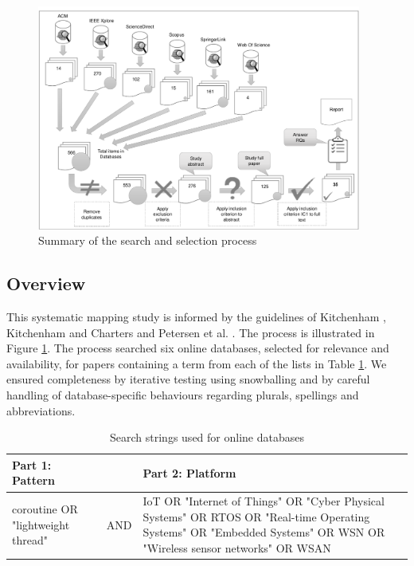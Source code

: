 \documentclass[format=acmsmall, review=false, screen=false]{acmart}
\begin{document}
\begin{figure}[h]
	\includegraphics[width=0.95\textwidth]{summary-of-search-and-selection-process}
	\caption{Summary of the search and selection process}
	\label{fig:sms}
\end{figure}

\subsection{Overview}

This systematic mapping study is informed by the guidelines of Kitchenham \cite{Kitchenham2004}, Kitchenham and Charters \cite{Kitchenham2007} and Petersen et al. \cite{Petersen2008}. The process is illustrated in Figure \ref{fig:sms}. The process searched six online databases, selected for relevance \cite{Brereton2007} and availability, for papers containing a term from each of the lists in Table \ref{table-databases}. We ensured completeness by iterative testing using snowballing \cite{Kitchenham2011a, Petersen2015} and by careful handling of database-specific behaviours regarding plurals, spellings and abbreviations.

\begin{table}[h]%
	\caption{Search strings used for online databases}
	\label{table-databases}
	\begin{tabular}{ p{4.5cm} c p{7cm} }
		\hline
		Part 1: Pattern & & Part 2: Platform\\
		\hline
		coroutine OR "lightweight thread" & AND & IoT OR "Internet of Things" OR "Cyber Physical Systems" OR RTOS OR "Real-time Operating Systems" OR "Embedded Systems" OR WSN OR "Wireless sensor networks" OR WSAN\\
		\hline
	\end{tabular}
\end{table}
\end{document}
